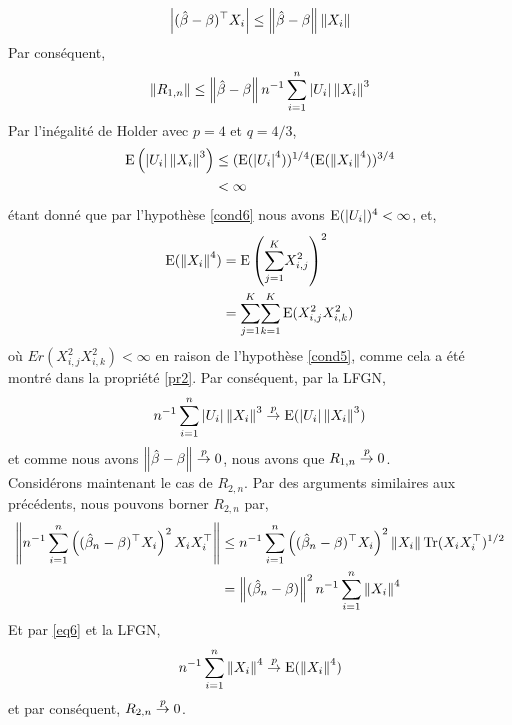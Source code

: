 \begin{align*}
\left\vert {(\hat{\beta}- \beta)^\top X_i} \right\vert \leq \left\Vert {\hat{\beta}- \beta} \right\Vert\left\Vert {X_i} \right\Vert
\end{align*}
Par conséquent,
\begin{align*}
\left\Vert {R_{1,n}} \right\Vert \leq \left\Vert {\hat{\beta}- \beta} \right\Vert n^{-1} \sum_{i=1}^n \left\vert {U_i} \right\vert\left\Vert {X_i} \right\Vert^3
\end{align*}
Par l'inégalité de Holder avec $p=4$ et $q=4/3$,
\begin{align*}
\operatorname{E}\left(\left\vert {U_i} \right\vert\left\Vert {X_i} \right\Vert^3\right)&\leq (\operatorname{E}(\left\vert {U_i} \right\vert^4))^{1/4}(\operatorname{E}(\left\Vert {X_i} \right\Vert^4))^{3/4}\\
&< \infty
\end{align*}
étant donné que par l'hypothèse \ref{cond6} nous avons $\operatorname{E}(\left\vert {U_i} \right\vert)^4<\infty$, et,
\begin{align}
\operatorname{E}(\left\Vert {X_i} \right\Vert^4) &= \operatorname{E}\left(\underset{j=1}{\overset{K}{\sum}}X_{i, j}^2\right)^2\nonumber\\
&= \underset{j=1}{\overset{K}{\sum}}\underset{k=1}{\overset{K}{\sum}}\operatorname{E}(X_{i, j}^2X_{i, k}^2)
\label{eq6}
\end{align}
où $Er(X_{i, j}^2X_{i, k}^2) < \infty$ en raison de l'hypothèse \ref{cond5}, comme cela a été montré dans la propriété \ref{pr2}. Par conséquent, par la LFGN,
\begin{align*}
n^{-1} \sum_{i=1}^n \left\vert {U_i} \right\vert\left\Vert {X_i} \right\Vert^3 \overset{p}{\rightarrow} \operatorname{E}(\left\vert {U_i} \right\vert\left\Vert {X_i} \right\Vert^3)
\end{align*}
et comme nous avons $\left\Vert {\hat{\beta}- \beta} \right\Vert \overset{p}{\rightarrow} 0$, nous avons que $R_{1,n} \overset{p}{\rightarrow} 0$.\\
Considérons maintenant le cas de $R_{2,n}$. Par des arguments similaires aux précédents, nous pouvons borner $R_{2,n}$ par,
\begin{align*}
\left\Vert {n^{-1} \sum_{i=1}^n\left((\hat{\beta}_n-\beta)^\top X_i\right)^2 X_iX_i^\top} \right\Vert &\leq
n^{-1}\sum_{i=1}^n  \left((\hat{\beta}_n-\beta)^\top X_i\right)^2 \left\Vert {X_i} \right\Vert\operatorname{Tr}(X_iX_i^\top)^{1/2}\\
&= \left\Vert {(\hat{\beta}_n-\beta)} \right\Vert^2n^{-1} \sum_{i=1}^n\left\Vert {X_i} \right\Vert^4
\end{align*}
Et par \eqref{eq6} et la LFGN,
\begin{align*}
n^{-1} \sum_{i=1}^n\left\Vert {X_i} \right\Vert^4 \overset{p}{\rightarrow} \operatorname{E}(\left\Vert {X_i} \right\Vert^4)
\end{align*}
et par conséquent, $R_{2,n} \overset{p}{\rightarrow} 0$.



 